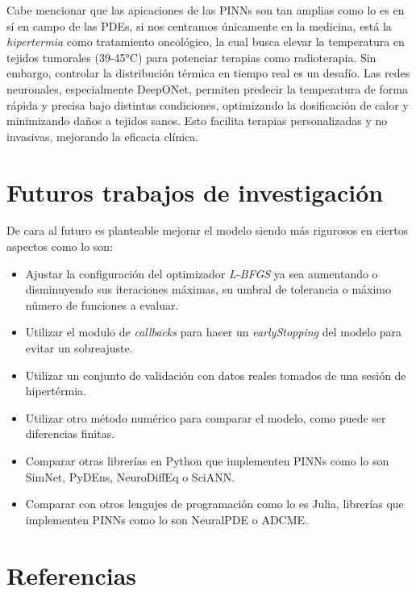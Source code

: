 \documentclass[
  spanish,
  us-letterpaper,
  DIV=11,
  numbers=noendperiod]{scrreprt}
\theoremstyle{plain}
\theoremstyle{definition}
\theoremstyle{remark}
\begin{document}
Cabe mencionar que las apicaciones de las PINNs son tan amplias como lo
es en sí en campo de las PDEs, si nos centramos únicamente en la
medicina, está la \emph{hipertermia} como tratamiento oncológico, la
cual busca elevar la temperatura en tejidos tumorales (39-45°C) para
potenciar terapias como radioterapia. Sin embargo, controlar la
distribución térmica en tiempo real es un desafío. Las redes neuronales,
especialmente DeepONet, permiten predecir la temperatura de forma rápida
y precisa bajo distintas condiciones, optimizando la dosificación de
calor y minimizando daños a tejidos sanos. Esto facilita terapias
personalizadas y no invasivas, mejorando la eficacia clínica.


\chapter{Futuros trabajos de
investigación}\label{futuros-trabajos-de-investigaciuxf3n}

De cara al futuro es planteable mejorar el modelo siendo más rigurosos
en ciertos aspectos como lo son:

\begin{itemize}
\item
  Ajustar la configuración del optimizador \emph{L-BFGS} ya sea
  aumentando o disminuyendo sus iteraciones máximas, su umbral de
  tolerancia o máximo número de funciones a evaluar.
\item
  Utilizar el modulo de \emph{callbacks} para hacer un
  \emph{earlyStopping} del modelo para evitar un sobreajuste.
\item
  Utilizar un conjunto de validación con datos reales tomados de una
  sesión de hipertérmia.
\item
  Utilizar otro método numérico para comparar el modelo, como puede ser
  diferencias finitas.
\item
  Comparar otras librerías en Python que implementen PINNs como lo son
  SimNet, PyDEns, NeuroDiffEq o SciANN.
\item
  Comparar con otros lengujes de programación como lo es Julia,
  librerías que implementen PINNs como lo son NeuralPDE o ADCME.
\end{itemize}


\chapter*{Referencias}\label{referencias}
\end{document}
